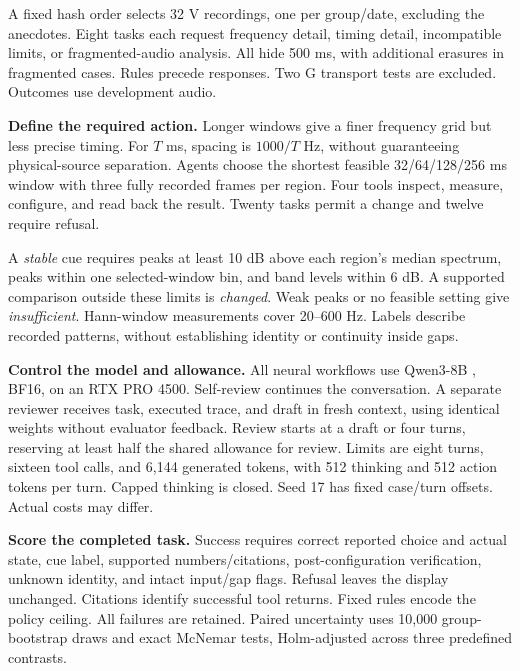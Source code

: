 \documentclass[runningheads,orivec]{llncs}
\begin{document}
A fixed hash order selects 32 V recordings, one per group/date, excluding the anecdotes. Eight tasks each request frequency detail, timing detail, incompatible limits, or fragmented-audio analysis. All hide 500 ms, with additional erasures in fragmented cases. Rules precede responses. Two G transport tests are excluded. Outcomes use development audio.

\textbf{Define the required action.} Longer windows give a finer frequency grid but less precise timing. For $T$ ms, spacing is $1000/T$ Hz, without guaranteeing physical-source separation. Agents choose the shortest feasible 32/64/128/256 ms window with three fully recorded frames per region. Four tools inspect, measure, configure, and read back the result. Twenty tasks permit a change and twelve require refusal.

A \emph{stable} cue requires peaks at least 10 dB above each region's median spectrum, peaks within one selected-window bin, and band levels within 6 dB. A supported comparison outside these limits is \emph{changed}. Weak peaks or no feasible setting give \emph{insufficient}. Hann-window measurements cover 20--600 Hz. Labels describe recorded patterns, without establishing identity or continuity inside gaps.

\textbf{Control the model and allowance.} All neural workflows use Qwen3-8B \cite{qwen3}, BF16, on an RTX PRO 4500. Self-review continues the conversation. A separate reviewer receives task, executed trace, and draft in fresh context, using identical weights without evaluator feedback. Review starts at a draft or four turns, reserving at least half the shared allowance for review. Limits are eight turns, sixteen tool calls, and 6,144 generated tokens, with 512 thinking and 512 action tokens per turn. Capped thinking is closed. Seed 17 has fixed case/turn offsets. Actual costs may differ.

\textbf{Score the completed task.} Success requires correct reported choice and actual state, cue label, supported numbers/citations, post-configuration verification, unknown identity, and intact input/gap flags. Refusal leaves the display unchanged. Citations identify successful tool returns. Fixed rules encode the policy ceiling. All failures are retained. Paired uncertainty uses 10,000 group-bootstrap draws and exact McNemar tests, Holm-adjusted across three predefined contrasts.
\end{document}

